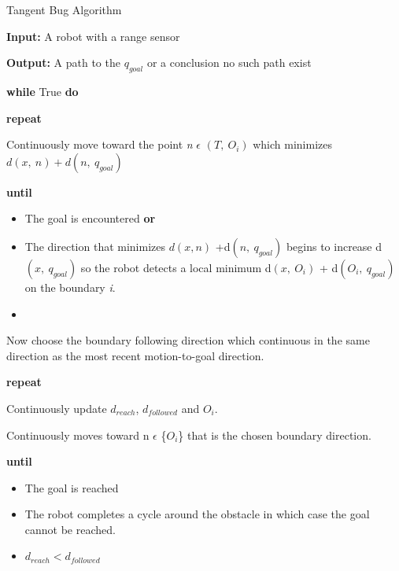 \documentclass[../Head/Main.tex]{subfiles}
\begin{document}
\begin{Pseudo}{Tangent Bug Algorithm}{}
	\begin{Indentation}
		\item \textbf{Input:} A robot with a range sensor
		\item \textbf{Output:} A path to the $q_{goal}$	or a conclusion no such path exist 
		\begin{Indentation}
		
		\item \textbf{while} True \textbf{do}
			
			\begin{Indentation}
			
			\item \textbf{repeat}
			
				\begin{Indentation}

				\item Continuously move toward the point \textit{n} $\epsilon$ $\left(T,~O_i\right)$ which minimizes $d(x,~n) + d \left(n,~q_{goal}\right)$
				
				\item \textbf{until}
				\begin{itemize}
					\item The goal is encountered \textbf{or}
					\item The direction that minimizes ${d(x,n)}$ +d$\left(n,~q_{goal}\right)$ begins to increase d$\left(x,~q_{goal}\right)$ so the robot detects a local minimum d$\left(x,~O_i\right)$ + 
					d$\left(O_i,~q_{goal}\right)$ on the boundary \textit{i}.
					\item[ ]		
				\end{itemize}
				Now choose the boundary following direction which continuous in the same direction as the most recent motion-to-goal direction. 
				
				
				\item \textbf{repeat}
				\item Continuously update $d_{reach}$, $d_{followed}$ and $O_i$. 
				\item Continuously moves toward n $\epsilon$ \{$O_i$\} that is the chosen boundary direction.  
				
				\item \textbf{until}
				
				\begin{itemize}
				\item The goal is reached 
				\item The robot completes a cycle around the obstacle in which case the goal cannot be reached. 
				\item $d_{reach} < d_{followed}$
				

\end{itemize}
\end{Indentation}
\end{Indentation}
\end{Indentation}
\end{Indentation}
\end{Pseudo}
\end{document}
